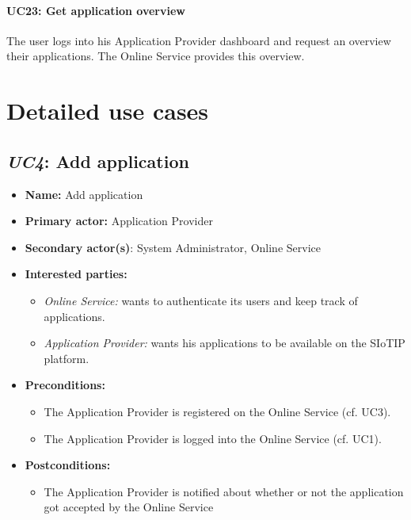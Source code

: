 \documentclass[english]{sareport}
\begin{document}
\paragraph{UC23: Get application overview}
The user logs into his Application Provider dashboard and request an overview their applications. The Online Service provides this overview.


\section{Detailed use cases}

\subsection{\emph{UC4}: Add application}
\begin{itemize}
    \item \textbf{Name:} Add application
    \item \textbf{Primary actor:} Application Provider
    \item \textbf{Secondary actor(s)}: System Administrator, Online Service
    \item \textbf{Interested parties:} 
        \begin{itemize}
            \item \textit{Online Service:} wants to authenticate its users and keep track of applications.
            \item \textit{Application Provider:} wants his applications to be available on the SIoTIP platform.
        \end{itemize}

    \item \textbf{Preconditions:}
        \begin{itemize}
            \item The Application Provider is registered on the Online Service (cf. UC3).
            \item The Application Provider is logged into the Online Service (cf. UC1).
        \end{itemize}

    \item \textbf{Postconditions:}
        \begin{itemize}
            \item The Application Provider is notified about whether or not the application got accepted by the Online Service
        \end{itemize}
        

\end{itemize}
\end{document}
